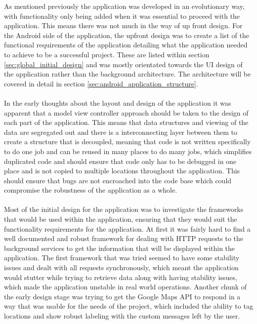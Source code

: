As mentioned previously the application was developed in an evolutionary way, with functionality only being added when it was essential to proceed with the application. This means there was not much in the way of up front design. For the Android side of the application, the upfront design was to create a list of the functional requirements of the application detailing what the application needed to achieve to be a successful project. These are listed within section \ref{sec:global_initial_design} and was mostly orientated towards the UI design of the application rather than the background architecture. The architecture will be covered in detail in section \ref{sec:android_application_structure}.\\
\\
In the early thoughts about the layout and design of the application it was apparent that a model view controller approach should be taken to the design of each part of the application. This means that data structures and viewing of the data are segregated out and there is a interconnecting layer between them to create a structure that is decoupled, meaning that code is not written specifically to do one job and can be reused in many places to do many jobs, which simplifies duplicated code and should ensure that code only has to be debugged in one place and is not copied to multiple locations throughout the application. This should ensure that bugs are not encroached into the code base which could compromise the robustness of the application as a whole.\\
\\
Most of the initial design for the application was to investigate the frameworks that would be used within the application, ensuring that they would suit the functionality requirements for the application. At first it was fairly hard to find a well documented and robust framework for dealing with HTTP requests to the background services to get the information that will be displayed within the application. The first framework that was tried seemed to have some stability issues and dealt with all requests synchronously, which meant the application would stutter while trying to retrieve data along with having stability issues, which made the application unstable in real world operations. Another chunk of the early design stage was trying to get the Google Maps API to respond in a way that was usable for the needs of the project, which included the ability to tag locations and show robust labeling with the custom messages left by the user.

